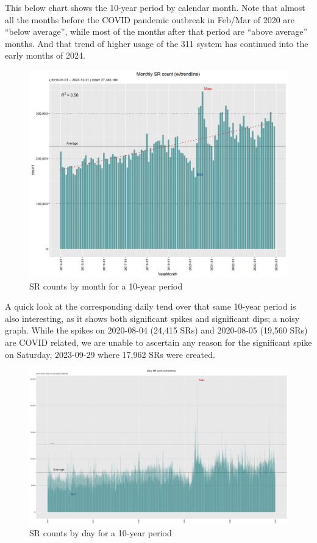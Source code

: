 \documentclass[12pt, titlepage]{article}
\begin{document}
This below chart shows the 10-year period by calendar month. Note that almost all the months before the COVID pandemic outbreak in Feb/Mar
of 2020 are ``below average'', while most of the months after that period are ``above average'' months. And that trend of higher usage
of the 311 system has continued into the early months of 2024.

\begin{figure}[htbp]
  \centering
  \includegraphics[width=\textwidth]{Monthly.png}
  \caption{SR counts by month for a 10-year period}
  \label{fig:monthly-counts}
\end{figure}

A quick look at the corresponding  daily tend over that same 10-year period is also interesting, as it shows both significant spikes
and significant dips; a noisy graph. While the spikes on 2020-08-04 (24,415 SRs) and 2020-08-05 (19,560 SRs) are COVID related, we are unable to 
ascertain any reason for the significant spike on Saturday, 2023-09-29 where 17,962 SRs were created.

\begin{figure}[H]
  \centering
  \includegraphics[width=\textwidth]{Daily.png}
  \caption{SR counts by day for a 10-year period}
  \label{fig:daily-counts}
\end{figure}
\end{document}

